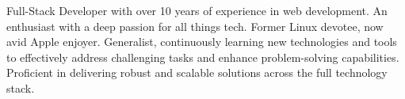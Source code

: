 

\begin{cvparagraph}

Full-Stack Developer with over 10 years of experience in web development. An enthusiast with a deep passion for all things tech. Former Linux devotee, now avid Apple enjoyer. Generalist, continuously learning new technologies and tools to effectively address challenging tasks and enhance problem-solving capabilities. Proficient in delivering robust and scalable solutions across the full technology stack.
\end{cvparagraph}
